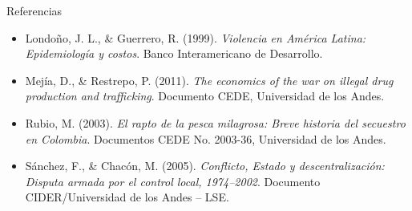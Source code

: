 \documentclass[aspectratio=169,xcolor=dvipsnames, t]{beamer}
\begin{document}
\begin{frame}{Referencias}
\begin{itemize}
    \item Londoño, J. L., \& Guerrero, R. (1999). \textit{Violencia en América Latina: Epidemiología y costos}. Banco Interamericano de Desarrollo.

    \item Mejía, D., \& Restrepo, P. (2011). \textit{The economics of the war on illegal drug production and trafficking}. Documento CEDE, Universidad de los Andes.

    \item Rubio, M. (2003). \textit{El rapto de la pesca milagrosa: Breve historia del secuestro en Colombia}. Documentos CEDE No. 2003-36, Universidad de los Andes.

    \item Sánchez, F., \& Chacón, M. (2005). \textit{Conflicto, Estado y descentralización: Disputa armada por el control local, 1974–2002}. Documento CIDER/Universidad de los Andes – LSE.


\end{itemize}
\end{frame}
\end{document}
